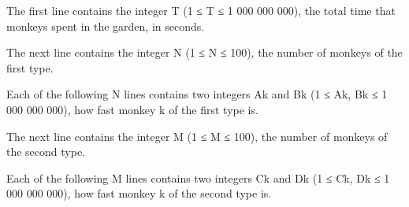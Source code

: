 The first line contains the integer T (1 ≤ T ≤ 1 000 000 000), the total time that monkeys spent in the garden, in seconds.  

   The next line contains the integer N (1 ≤ N ≤ 100), the number of monkeys of the first type.  

   Each of the following N lines contains two integers Ak and Bk (1 ≤ Ak, Bk ≤ 1 000 000 000), how fast monkey k of the first type is.  

   The next line contains the integer M (1 ≤ M ≤ 100), the number of monkeys of the second type.  

   Each of the following M lines contains two integers Ck and Dk (1 ≤ Ck, Dk ≤ 1 000 000 000), how fast monkey k of the second type is.